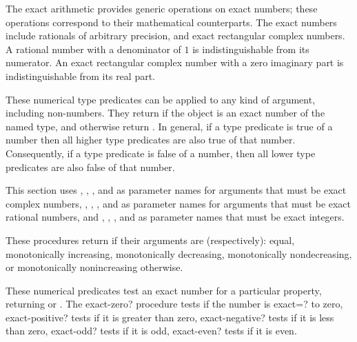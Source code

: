 The exact arithmetic provides generic operations on exact numbers;
these operations correspond to their mathematical counterparts.  The
exact numbers include rationals of arbitrary precision, and exact
rectangular complex numbers.  A rational number with a denominator of
$1$ is indistinguishable from its numerator.  An exact rectangular
complex number with a zero imaginary part is indistinguishable from
its real part.

\begin{entry}{%
}

These numerical type predicates can be applied to any kind of
argument, including non-numbers.  They return \schtrue{} if the object
is an exact number of the named type, and otherwise return
\schfalse{}.  In general, if a type predicate is true of a number then
all higher type predicates are also true of that number.
Consequently, if a type predicate is false of a number, then all lower
type predicates are also false of that number.
\end{entry}

This section uses , , , and  as
parameter names for arguments that must be exact complex numbers, ,
, , and  as parameter names for arguments 
that must be exact rational numbers, and , , , and
 as parameter names that must be exact integers.

\begin{entry}{%
}

These procedures return \schtrue{} if their arguments are
(respectively): equal, monotonically increasing, monotonically
decreasing, monotonically nondecreasing, or monotonically
nonincreasing \schfalse{} otherwise.
\end{entry}

\begin{entry}{%
}

These numerical predicates test an exact number for a particular
property, returning \schtrue{} or \schfalse{}.  The {\cf exact-zero?} procedure
tests if the number is {\cf exact=?} to zero, {\cf exact-positive?}
tests if it is greater than zero, {\cf exact-negative?} tests if it is
less than zero, {\cf exact-odd?} tests if it is odd, {\cf exact-even?}
tests if it is even.
\end{entry}

